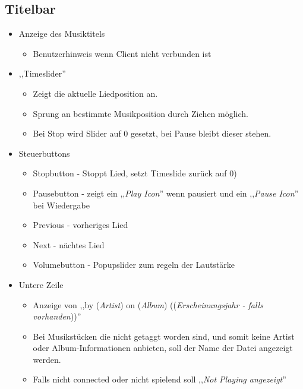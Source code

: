 \subsection{Titelbar}
\begin{itemize}
	\item Anzeige des Musiktitels
	\begin{itemize}
		\item Benutzerhinweis wenn Client nicht verbunden ist
	\end{itemize}
	\item ,,Timeslider''
	\begin{itemize}
		\item Zeigt die aktuelle Liedposition an.
		\item Sprung an bestimmte Musikposition durch Ziehen möglich.
		\item Bei Stop wird Slider auf 0 gesetzt, bei Pause  bleibt dieser stehen.
	\end{itemize}
	\item Steuerbuttons
	\begin{itemize}
		\item Stopbutton - Stoppt Lied, setzt Timeslide zurück auf 0)
        \item Pausebutton - zeigt ein ,,\emph{Play Icon}'' wenn pausiert und ein ,,\emph{Pause Icon}'' bei Wiedergabe
		\item Previous - vorheriges Lied
		\item Next - nächtes Lied
		\item Volumebutton - Popupslider zum regeln der Lautstärke
	\end{itemize}
	\item Untere Zeile
	\begin{itemize}
        \item Anzeige von ,,by (\emph{Artist}) on (\emph{Album}) ((\emph{Erscheinungsjahr - falls vorhanden}))''
        \item Bei Musikstücken die nicht getaggt worden sind, und somit keine Artist oder Album-Informationen anbieten,
            soll der Name der Datei angezeigt werden. 
        \item Falls nicht connected oder nicht spielend soll ,,\emph{Not Playing angezeigt}''
    \end{itemize}		
\end{itemize} 


